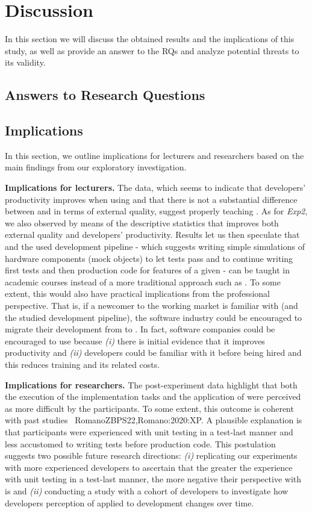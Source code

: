 \chapter{Discussion}
In this section we will discuss the obtained results and the implications of this study, as well as provide an answer to the RQs and analyze potential threats to its validity.

\section{Answers to Research Questions}



\section{Implications}
In this section, we outline implications for lecturers and researchers based on the main findings from our exploratory investigation. 

\textbf{Implications for lecturers.} The data, which seems to indicate that developers' productivity improves when using  \tdd and that there is not a substantial difference between \tdd and \notdd in terms of external quality, suggest properly teaching \tdd. 
As for \textit{Exp2}, we also observed by means of the descriptive statistics that \tdd improves both external quality and developers' productivity. 
Results let us then speculate that \tdd and the used development pipeline \cite{TDDEC}- which suggests writing simple simulations of hardware components (mock objects) to let tests pass and to continue writing first tests and then production code for features of a given \es - can be taught in academic \es courses instead of a more traditional approach such as \notdd. 
To some extent, this would also have practical implications from the professional perspective. That is, if a newcomer to the working market is familiar with \tdd (and the studied development pipeline), the software industry could be encouraged to migrate their development from \notdd to \tdd. In fact, software companies could be encouraged to use \tdd because \textit{(i)} there is initial evidence that it improves productivity and \textit{(ii)} developers could be familiar with it before being hired and this reduces training and its related costs.


\textbf{Implications for researchers.} 
The post-experiment data highlight that both the execution of the implementation tasks and the application of \tdd were perceived as more difficult by the participants. 
To some extent, this outcome is coherent with past studies \eg~{RomanoZBPS22,Romano:2020:XP}. 
A plausible explanation is that participants were experienced with unit testing in a test-last manner and less accustomed to writing tests before production code. 
This postulation suggests two possible future research directions: \textit{(i)} replicating our experiments  with more experienced developers to ascertain that the greater the experience with unit testing in a test-last manner, the more negative their perspective with \tdd is and \textit{(ii)} conducting a study with a cohort of developers to investigate how developers perception of \tdd applied to \es development changes over time.



